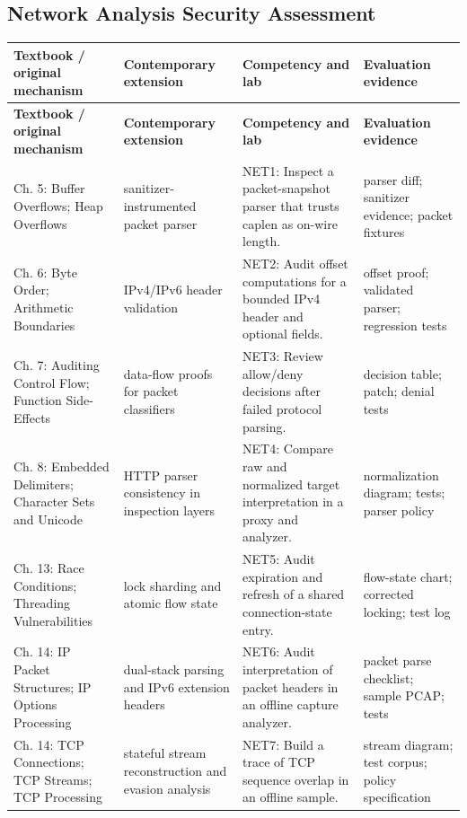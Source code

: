 \documentclass[10pt,letterpaper]{article}
\begin{document}
\subsection{Network Analysis Security Assessment}
\begingroup\footnotesize\setlength\tabcolsep{3pt}
\begin{longtable}{>{\raggedright\arraybackslash}p{}>{\raggedright\arraybackslash}p{}>{\raggedright\arraybackslash}p{}>{\raggedright\arraybackslash}p{}}\toprule
\textbf{Textbook / original mechanism} & \textbf{Contemporary extension} & \textbf{Competency and lab} & \textbf{Evaluation evidence}\\\midrule\endfirsthead
\toprule \textbf{Textbook / original mechanism} & \textbf{Contemporary extension} & \textbf{Competency and lab} & \textbf{Evaluation evidence}\\\midrule\endhead
Ch. 5: Buffer Overflows; Heap Overflows & sanitizer-instrumented packet parser & NET1: Inspect a packet-snapshot parser that trusts caplen as on-wire length. & parser diff; sanitizer evidence; packet fixtures\\\midrule
Ch. 6: Byte Order; Arithmetic Boundaries & IPv4/IPv6 header validation & NET2: Audit offset computations for a bounded IPv4 header and optional fields. & offset proof; validated parser; regression tests\\\midrule
Ch. 7: Auditing Control Flow; Function Side-Effects & data-flow proofs for packet classifiers & NET3: Review allow/deny decisions after failed protocol parsing. & decision table; patch; denial tests\\\midrule
Ch. 8: Embedded Delimiters; Character Sets and Unicode & HTTP parser consistency in inspection layers & NET4: Compare raw and normalized target interpretation in a proxy and analyzer. & normalization diagram; tests; parser policy\\\midrule
Ch. 13: Race Conditions; Threading Vulnerabilities & lock sharding and atomic flow state & NET5: Audit expiration and refresh of a shared connection-state entry. & flow-state chart; corrected locking; test log\\\midrule
Ch. 14: IP Packet Structures; IP Options Processing & dual-stack parsing and IPv6 extension headers & NET6: Audit interpretation of packet headers in an offline capture analyzer. & packet parse checklist; sample PCAP; tests\\\midrule
Ch. 14: TCP Connections; TCP Streams; TCP Processing & stateful stream reconstruction and evasion analysis & NET7: Build a trace of TCP sequence overlap in an offline sample. & stream diagram; test corpus; policy specification\\\midrule

\end{longtable}
\end{document}
